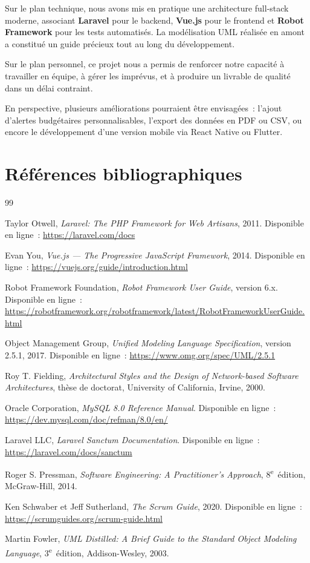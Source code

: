 ﻿\documentclass[12pt,a4paper]{report}
\begin{document}
Sur le plan technique, nous avons mis en pratique une architecture full-stack moderne,
associant \textbf{Laravel} pour le backend, \textbf{Vue.js} pour le frontend et
\textbf{Robot Framework} pour les tests automatisés. La modélisation UML réalisée
en amont a constitué un guide précieux tout au long du développement.

Sur le plan personnel, ce projet nous a permis de renforcer notre capacité à
travailler en équipe, à gérer les imprévus, et à produire un livrable de
qualité dans un délai contraint.

En perspective, plusieurs améliorations pourraient être envisagées~: l'ajout
d'alertes budgétaires personnalisables, l'export des données en PDF ou CSV, ou
encore le développement d'une version mobile via React Native ou Flutter.

\chapter*{Références bibliographiques}

\begin{thebibliography}{99}

Taylor Otwell,
\textit{Laravel: The PHP Framework for Web Artisans}, 2011.
Disponible en ligne~: \url{https://laravel.com/docs}

Evan You,
\textit{Vue.js --- The Progressive JavaScript Framework}, 2014.
Disponible en ligne~: \url{https://vuejs.org/guide/introduction.html}

Robot Framework Foundation,
\textit{Robot Framework User Guide}, version 6.x.
Disponible en ligne~: \url{https://robotframework.org/robotframework/latest/RobotFrameworkUserGuide.html}

Object Management Group,
\textit{Unified Modeling Language Specification}, version 2.5.1, 2017.
Disponible en ligne~: \url{https://www.omg.org/spec/UML/2.5.1}

Roy T. Fielding,
\textit{Architectural Styles and the Design of Network-based Software Architectures},
thèse de doctorat, University of California, Irvine, 2000.

Oracle Corporation,
\textit{MySQL 8.0 Reference Manual}.
Disponible en ligne~: \url{https://dev.mysql.com/doc/refman/8.0/en/}

Laravel LLC,
\textit{Laravel Sanctum Documentation}.
Disponible en ligne~: \url{https://laravel.com/docs/sanctum}

Roger S. Pressman,
\textit{Software Engineering: A Practitioner's Approach},
8\textsuperscript{e}~édition, McGraw-Hill, 2014.

Ken Schwaber et Jeff Sutherland,
\textit{The Scrum Guide}, 2020.
Disponible en ligne~: \url{https://scrumguides.org/scrum-guide.html}

Martin Fowler,
\textit{UML Distilled: A Brief Guide to the Standard Object Modeling Language},
3\textsuperscript{e}~édition, Addison-Wesley, 2003.

\end{thebibliography}
\end{document}
